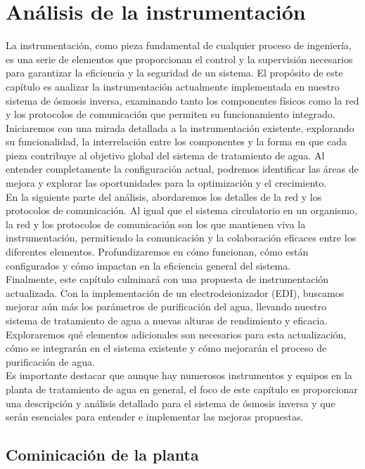 \chapter{Análisis de la instrumentación}

La instrumentación, como pieza fundamental de cualquier proceso de ingeniería, es una serie de 
elementos que proporcionan el control y la supervisión necesarios para garantizar la eficiencia y la 
seguridad de un sistema. El propósito de este capítulo es analizar la instrumentación actualmente 
implementada en nuestro sistema de ósmosis inversa, examinando tanto los componentes físicos 
como la red y los protocolos de comunicación que permiten su funcionamiento integrado.\\

Iniciaremos con una mirada detallada a la instrumentación existente, explorando su funcionalidad, 
la interrelación entre los componentes y la forma en que cada pieza contribuye al objetivo global del 
sistema de tratamiento de agua. Al entender completamente la configuración actual, podremos identificar 
las áreas de mejora y explorar las oportunidades para la optimización y el crecimiento.\\

En la siguiente parte del análisis, abordaremos los detalles de la red y los protocolos de 
comunicación. Al igual que el sistema circulatorio en un organismo, la red y los protocolos de 
comunicación son los que mantienen viva la instrumentación, permitiendo la comunicación y la colaboración 
eficaces entre los diferentes elementos. Profundizaremos en cómo funcionan, cómo están configurados y 
cómo impactan en la eficiencia general del sistema.\\

Finalmente, este capítulo culminará con una propuesta de instrumentación actualizada. Con la 
implementación de un electrodeionizador (EDI), buscamos mejorar aún más los parámetros de purificación del agua, 
llevando nuestro sistema de tratamiento de agua a nuevas alturas de rendimiento y eficacia. Exploraremos qué 
elementos adicionales son necesarios para esta actualización, cómo se integrarán en el sistema existente y cómo
mejorarán el proceso de purificación de agua.\\

Es importante destacar que aunque hay numerosos instrumentos y equipos en la planta de tratamiento de agua en general, 
el foco de este capítulo es proporcionar una descripción y análisis detallado  para el sistema 
de ósmosis inversa y que serán esenciales para entender e implementar las mejoras propuestas.\\




\section{Cominicación de la planta}




